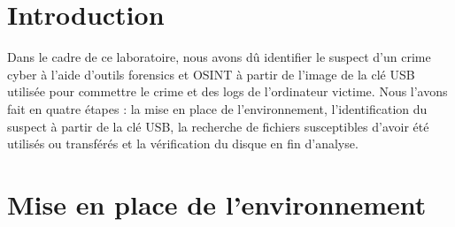 \documentclass[a4paper]{article}
\begin{document}
\let\cleardoublepage\clearpage















\section{Introduction}

Dans le cadre de ce laboratoire, nous avons dû identifier le suspect d'un crime cyber à l'aide d'outils forensics et OSINT à partir de l'image de la clé USB utilisée pour commettre le crime et des logs de l'ordinateur victime. Nous l'avons fait en quatre étapes : la mise en place de l'environnement, l'identification du suspect à partir de la clé USB, la recherche de fichiers susceptibles d'avoir été utilisés ou transférés et la vérification du disque en fin d'analyse.














\section{Mise en place de l'environnement}
\end{document}
